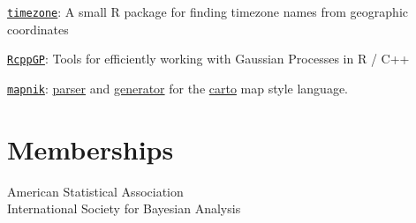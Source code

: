 \documentclass[margin,line]{res}
\begin{document}
\begin{resume}
\vspace{-0.15cm}
\href{https://github.com/rundel/timezone}{\texttt{timezone}}: A small R package for finding timezone names from geographic coordinates

\vspace{-0.15cm}
\href{https://github.com/rundel/RcppGP}{\texttt{RcppGP}}: Tools for efficiently working with Gaussian Processes in R / C++

\vspace{-0.15cm}
\href{http://mapnik.org}{\texttt{mapnik}}: \href{https://github.com/rundel/carto-parser}{parser} and \href{https://github.com/rundel/carto-generator}{generator} for the \href{https://github.com/mapbox/carto}{carto} map style language.

\vspace{4mm}

\section{\sc Memberships}
American Statistical Association \\
International Society for Bayesian Analysis

\end{resume}
\end{document}
